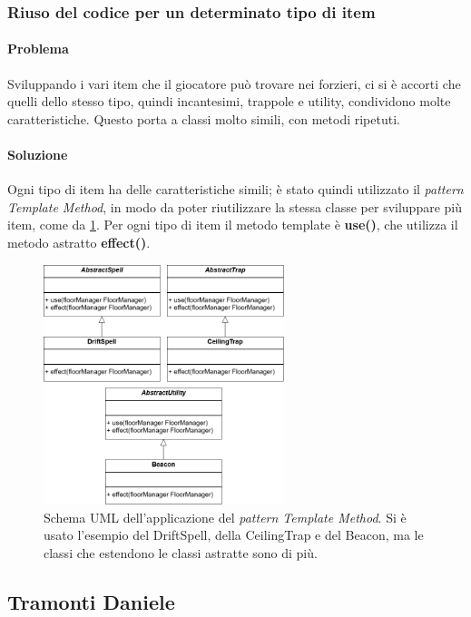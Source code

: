 \documentclass{report}
\begin{document}
\clearpage
\subsubsection{Riuso del codice per un determinato tipo di item}

\paragraph{Problema} Sviluppando i vari item che il giocatore può trovare nei forzieri, ci si è accorti che quelli dello stesso tipo, quindi incantesimi, trappole e utility, condividono molte caratteristiche.
%
Questo porta a classi molto simili, con metodi ripetuti. 

\paragraph{Soluzione} Ogni tipo di item ha delle caratteristiche simili; è stato quindi utilizzato il \textit{pattern Template Method}, in modo da poter riutilizzare la stessa classe per sviluppare più item, come da \ref{img:templateItem}.
%
Per ogni tipo di item il metodo template è \textbf{use()}, che utilizza il metodo astratto \textbf{effect()}. 

\begin{figure}[H]
    \centering
    \includegraphics[width=7cm]{patternTemplateItem.drawio.png}
    \caption{Schema UML dell'applicazione del \textit{pattern Template Method}. Si è usato l'esempio del DriftSpell, della CeilingTrap e del Beacon, ma le classi che estendono le classi astratte sono di più.}
    \label{img:templateItem}
\end{figure}

\clearpage
\subsection{Tramonti Daniele}
\end{document}
